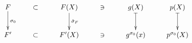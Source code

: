 \documentclass[dvipdfmx]{jsarticle}
\begin{document}
\[
\xymatrix{
F\ar[d]^{\sigma_0} & \subset & F(X)\ar[d]^{\tilde{\sigma}_F} & \ni & g(X)\ar@{|->}[d] & p(X)\ar@{|->}[d] \\
F'        & \subset & F'(X) & \ni & g^{\sigma_0}(x) & p^{\sigma_0}(X)}
\]
\end{document}
